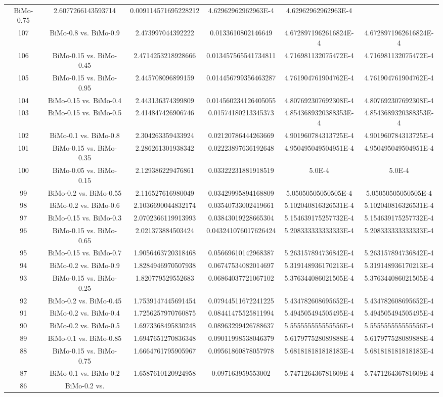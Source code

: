 \documentclass[a4paper,10pt]{article}
\begin{document}
\begin{landscape}
\begin{table}[!htp]
\begin{tabular}{cccccc}
BiMo-0.75&2.6077266143593714&0.009114571695228212&4.62962962962963E-4&4.62962962962963E-4\\107&BiMo-0.8 vs. BiMo-0.9&2.473997044392222&0.0133610802146649&4.6728971962616824E-4&4.6728971962616824E-4\\106&BiMo-0.15 vs. BiMo-0.45&2.4714253218928666&0.013457565541734811&4.716981132075472E-4&4.716981132075472E-4\\105&BiMo-0.15 vs. BiMo-0.95&2.445708096899159&0.014456799356463287&4.761904761904762E-4&4.761904761904762E-4\\104&BiMo-0.15 vs. BiMo-0.4&2.443136374399809&0.014560234126405055&4.807692307692308E-4&4.807692307692308E-4\\103&BiMo-0.15 vs. BiMo-0.5&2.414847426906746&0.01574180213345373&4.8543689320388353E-4&4.8543689320388353E-4\\102&BiMo-0.1 vs. BiMo-0.8&2.304263359433924&0.02120786444263669&4.901960784313725E-4&4.901960784313725E-4\\101&BiMo-0.15 vs. BiMo-0.35&2.286261301938342&0.02223897636192648&4.950495049504951E-4&4.950495049504951E-4\\100&BiMo-0.05 vs. BiMo-0.15&2.129386229476861&0.03322231881918519&5.0E-4&5.0E-4\\99&BiMo-0.2 vs. BiMo-0.55&2.116527616980049&0.03429995894168809&5.05050505050505E-4&5.05050505050505E-4\\98&BiMo-0.2 vs. BiMo-0.6&2.1036690044832174&0.03540733002419661&5.102040816326531E-4&5.102040816326531E-4\\97&BiMo-0.15 vs. BiMo-0.3&2.0702366119913993&0.03843019228665304&5.154639175257732E-4&5.154639175257732E-4\\96&BiMo-0.15 vs. BiMo-0.65&2.021373884503424&0.043241076017626424&5.208333333333333E-4&5.208333333333333E-4\\95&BiMo-0.15 vs. BiMo-0.7&1.9056463720318468&0.05669610142968387&5.263157894736842E-4&5.263157894736842E-4\\94&BiMo-0.2 vs. BiMo-0.9&1.8284946970507938&0.06747534082014697&5.319148936170213E-4&5.319148936170213E-4\\93&BiMo-0.15 vs. BiMo-0.25&1.820779529552683&0.06864037721067102&5.376344086021505E-4&5.376344086021505E-4\\92&BiMo-0.2 vs. BiMo-0.45&1.7539147445691454&0.07944511672241225&5.434782608695652E-4&5.434782608695652E-4\\91&BiMo-0.2 vs. BiMo-0.4&1.7256257970760875&0.08441475525811994&5.494505494505495E-4&5.494505494505495E-4\\90&BiMo-0.2 vs. BiMo-0.5&1.6973368495830248&0.08963299426788637&5.555555555555556E-4&5.555555555555556E-4\\89&BiMo-0.1 vs. BiMo-0.85&1.6947651270836348&0.09011998538046379&5.617977528089888E-4&5.617977528089888E-4\\88&BiMo-0.15 vs. BiMo-0.75&1.6664761795905967&0.09561860878057978&5.681818181818183E-4&5.681818181818183E-4\\87&BiMo-0.1 vs. BiMo-0.2&1.6587610120924958&0.097163959553002&5.747126436781609E-4&5.747126436781609E-4\\86&BiMo-0.2 vs. 
\end{tabular}
\end{table}
\end{landscape}
\end{document}
